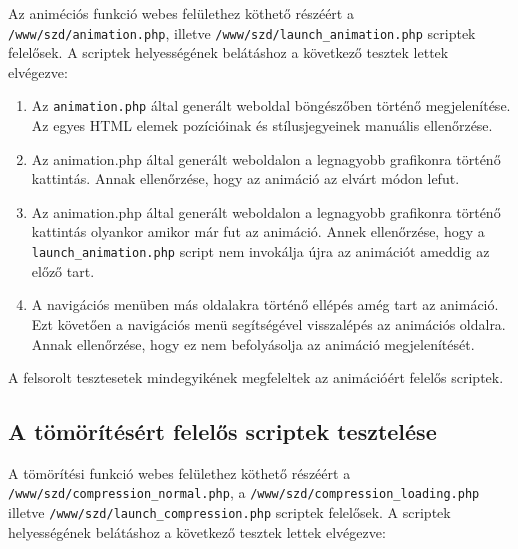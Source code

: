 \documentclass[oneside,titlepage,12pt,a4paper]{report}
\begin{document}
Az animéciós funkció webes felülethez köthető részéért a \texttt{/www/szd/animation.php}, illetve \texttt{/www/szd/launch\_animation.php} scriptek felelősek. A scriptek helyességének belátáshoz a következő tesztek lettek elvégezve:

\begin{enumerate}
\item Az \texttt{animation.php} által generált weboldal böngészőben történő megjelenítése. Az egyes HTML elemek pozícióinak és stílusjegyeinek manuális ellenőrzése.
\item Az animation.php által generált weboldalon a legnagyobb grafikonra történő kattintás. Annak ellenőrzése, hogy az animáció az elvárt módon lefut.
\item Az animation.php által generált weboldalon a legnagyobb grafikonra történő kattintás olyankor amikor már fut az animáció. Annek ellenőrzése, hogy a \texttt{launch\_animation.php} script nem invokálja újra az animációt ameddig az előző tart.
\item A navigációs menüben más oldalakra történő ellépés amég tart az animáció. Ezt követően a navigációs menü segítségével visszalépés az animációs oldalra. Annak ellenőrzése, hogy ez nem befolyásolja az animáció megjelenítését.
\end{enumerate}

A felsorolt tesztesetek mindegyikének megfeleltek az animációért felelős scriptek.

\subsection{A tömörítésért felelős scriptek tesztelése}

A tömörítési funkció webes felülethez köthető részéért a \texttt{/www/szd/compression\_normal.php}, a \texttt{/www/szd/compression\_loading.php} illetve \texttt{/www/szd/launch\_compression.php} scriptek felelősek. A scriptek helyességének belátáshoz a következő tesztek lettek elvégezve:
\end{document}

